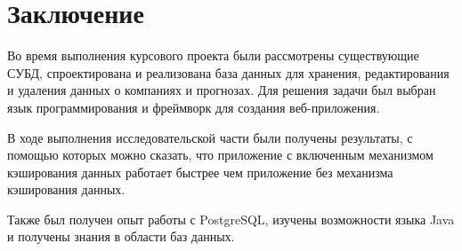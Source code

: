 \chapter*{Заключение}


Во время выполнения курсового проекта были рассмотрены существующие СУБД, спроектирована и реализована база данных для хранения, редактирования и удаления данных о компаниях и прогнозах. Для решения задачи был выбран язык программирования и фреймворк для создания веб-приложения.


В ходе выполнения исследовательской части были получены результаты, с помощью которых можно сказать, что приложение с включенным механизмом кэширования данных работает быстрее чем приложение без механизма кэширования данных.

Также был получен опыт работы с PostgreSQL, изучены возможности языка Java и получены знания в области баз данных.